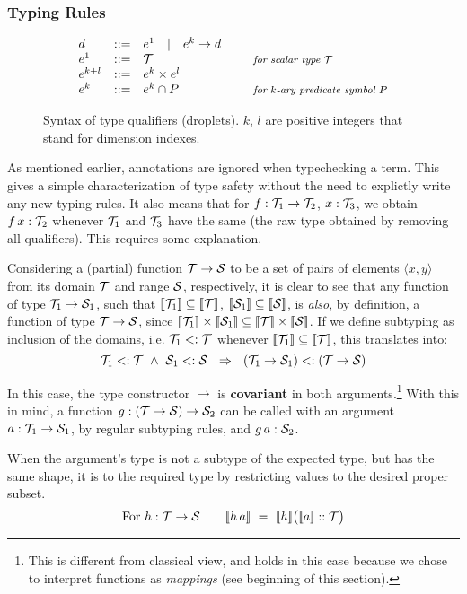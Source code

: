 \subsubsection*{Typing Rules}

\begin{figure}
\[
\begin{array}{lcll}
  d       & ::= & e^1 \quad |\quad e^k\to d \\
  e^1     & ::= & \T & \mbox{\it\small for scalar type $\T$} \\
  e^{k+l} & ::= & e^k \times e^l \\
  e^k     & ::= & e^k \cap P & \mbox{\it\small for $k$-ary predicate symbol $P$} 
\end{array}
\]
\vspace{-.5em}
\caption{\label{lang:droplets}
  Syntax of type qualifiers (droplets). $k$, $l$ are positive integers
  that stand for dimension indexes.}
\end{figure}

As mentioned earlier, annotations are ignored when typechecking a term.
This gives a simple characterization of type safety without the need to
explictly write any new typing rules. It also means that for $f:\T_1\to\T_2$, $x:\T_3$, we obtain $f\,x:\T_2$ whenever
$\T_1$ and $\T_3$ have the same  \cbstart(the raw type obtained by removing all qualifiers)\cbend.
This requires some explanation.

Considering a (partial) function $\T\to\S$ to be a set of pairs of elements $\langle x,y\rangle$ 
from its domain $\T$ and range $\S$, respectively, it is clear to see that any function of type $\T_1\to\S_1$,
such that $\semp{\T_1}\subseteq\semp{\T}$, $\semp{\S_1}\subseteq\semp{\S}$, 
is \emph{also}, by definition, a function of type $\T\to\S$, since $\semp{\T_1}\times\semp{\S_1}\subseteq\semp{\T}\times\semp{\S}$.
If we define subtyping as inclusion of the domains, i.e. $\T_1 <:\T$ whenever $\semp{\T_1}\subseteq\semp{\T}$,
this translates into:
%
\[\T_1<:\T ~\land~ \S_1<:\S ~~\Rightarrow~~ (\T_1\to\S_1) <: (\T\to\S)\]

In this case, the type constructor $\to$ is {\bf covariant} in both arguments.\footnote{This is different from classical view, and holds in this case because we chose to interpret functions as \emph{mappings} (see beginning of this section).}
With this in mind, a function $g:(\T\to\S)\to \S_2$ can be called with an argument $a: \T_1\to\S_1$,
by regular subtyping rules, and $g\,a : \S_2$.

When the argument's type is not a subtype of the expected type, but has the same shape,
it is  to the required type by restricting values to the desired proper subset.
%
\[\mbox{For }h:\T\to\S \qquad \semp{h\,a} ~=~ \semp{h}\big(\semp{a} :: \T\big)\]

